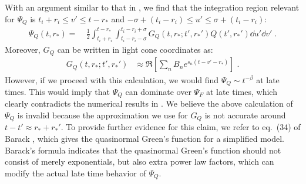 \label{sec:Psi_Q_details}
With an argument similar to that in , we find that the integration region relevant for $\Psi_Q$ is $t_i + r_i \leq v' \leq t - r_*$ and $-\sigma + (t_i-r_i) \leq u' \leq \sigma + (t_i-r_i)$:
\begin{align}
  \label{eq:Psi_Q_integral_u_v}
  \Psi_Q(t,r_*)
  = & \  \frac12 \int_{t_i+r_i}^{t-r_*} \int_{t_i-r_i-\sigma}^{t_i-r_i+\sigma} G_Q(t,r_*; t', r_*') Q(t',r_*') \dd{u'} \dd{v'} \;.
\end{align}
Moreover, $G_Q$ can be written in light cone coordinates as:
\begin{align}
  G_Q(t,r_*;t',r_*') &\approx \Re \left[ \sum_n B_n e^{s_n (t-v'-r_*)} \right] \;.
\end{align}
However, if we proceed with this calculation, we would find $\Psi_Q \sim t^{-\beta}$ at late times.
This would imply that $\Psi_Q$ can dominate over $\Psi_F$ at late times, which clearly contradicts the numerical results in .
We believe the above calculation of $\Psi_Q$ is invalid because the approximation we use for $G_Q$ is not accurate around $t - t' \approx r_* + r_*'$.
To provide further evidence for this claim, we refer to eq.~(34) of Barack \cite{Barack:1998bw}, which gives the quasinormal Green's function for a simplified model.
Barack's formula indicates that the quasinormal Green's function should not consist of merely exponentials, but also extra power law factors, which can modify the actual late time behavior of $\Psi_Q$.




